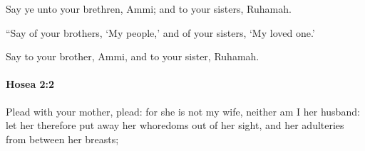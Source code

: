 			\begin{versebox}
					\item[BHS] 
					\item[LXX] 
					\item[ASV] Say ye unto your brethren, Ammi; and to your sisters, Ruhamah.
					\item[NIV] “Say of your brothers, ‘My people,’ and of your sisters, ‘My loved one.’
					\item[NRSV] Say to your brother, Ammi, and to your sister, Ruhamah.
			\end{versebox}

		\paragraph{Hosea 2:2} %
			\label{HOSEA-2-2}

			Plead with your mother, plead: for she is not my wife, neither am I her husband: let her therefore put away her whoredoms out of her sight, and her adulteries from between her breasts;

